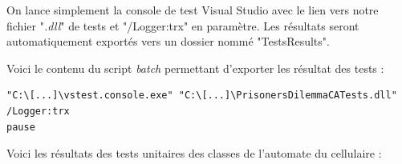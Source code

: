 \documentclass[a4paper]{article}
\begin{document}
On lance simplement la console de test Visual Studio avec le lien vers notre fichier "\textit{.dll}" de tests et "/Logger:trx" en paramètre. Les résultats seront automatiquement exportés vers un dossier nommé "TestsResults".

Voici le contenu du script \textit{batch} permettant d'exporter les résultat des tests :

\begin{lstlisting}
"C:\[...]\vstest.console.exe" "C:\[...]\PrisonersDilemmaCATests.dll" /Logger:trx
pause
\end{lstlisting}

\vspace{1cm}
\begin{center}
Voici les résultats des tests unitaires des classes de l'automate du cellulaire :
\end{center}
\end{document}
